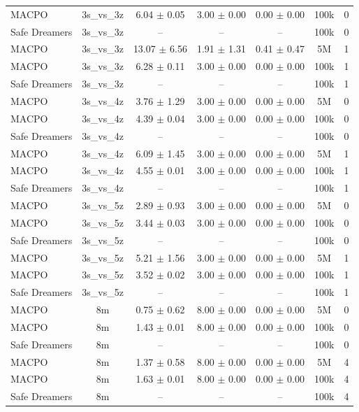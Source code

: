 \begin{longtable}{lcccccc}
MACPO & 3s\_vs\_3z & 6.04 $\pm$ 0.05 & 3.00 $\pm$ 0.00 & 0.00 $\pm$ 0.00 & 100k & 0 \\
Safe Dreamers & 3s\_vs\_3z & -- & -- & -- & 100k & 0 \\
\midrule
MACPO & 3s\_vs\_3z & 13.07 $\pm$ 6.56 & 1.91 $\pm$ 1.31 & 0.41 $\pm$ 0.47 & 5M & 1 \\
MACPO & 3s\_vs\_3z & 6.28 $\pm$ 0.11 & 3.00 $\pm$ 0.00 & 0.00 $\pm$ 0.00 & 100k & 1 \\
Safe Dreamers & 3s\_vs\_3z & -- & -- & -- & 100k & 1 \\
\midrule
MACPO & 3s\_vs\_4z & 3.76 $\pm$ 1.29 & 3.00 $\pm$ 0.00 & 0.00 $\pm$ 0.00 & 5M & 0 \\
MACPO & 3s\_vs\_4z & 4.39 $\pm$ 0.04 & 3.00 $\pm$ 0.00 & 0.00 $\pm$ 0.00 & 100k & 0 \\
Safe Dreamers & 3s\_vs\_4z & -- & -- & -- & 100k & 0 \\
\midrule
MACPO & 3s\_vs\_4z & 6.09 $\pm$ 1.45 & 3.00 $\pm$ 0.00 & 0.00 $\pm$ 0.00 & 5M & 1 \\
MACPO & 3s\_vs\_4z & 4.55 $\pm$ 0.01 & 3.00 $\pm$ 0.00 & 0.00 $\pm$ 0.00 & 100k & 1 \\
Safe Dreamers & 3s\_vs\_4z & -- & -- & -- & 100k & 1 \\
\midrule
MACPO & 3s\_vs\_5z & 2.89 $\pm$ 0.93 & 3.00 $\pm$ 0.00 & 0.00 $\pm$ 0.00 & 5M & 0 \\
MACPO & 3s\_vs\_5z & 3.44 $\pm$ 0.03 & 3.00 $\pm$ 0.00 & 0.00 $\pm$ 0.00 & 100k & 0 \\
Safe Dreamers & 3s\_vs\_5z & -- & -- & -- & 100k & 0 \\
\midrule
MACPO & 3s\_vs\_5z & 5.21 $\pm$ 1.56 & 3.00 $\pm$ 0.00 & 0.00 $\pm$ 0.00 & 5M & 1 \\
MACPO & 3s\_vs\_5z & 3.52 $\pm$ 0.02 & 3.00 $\pm$ 0.00 & 0.00 $\pm$ 0.00 & 100k & 1 \\
Safe Dreamers & 3s\_vs\_5z & -- & -- & -- & 100k & 1 \\
\midrule
MACPO & 8m & 0.75 $\pm$ 0.62 & 8.00 $\pm$ 0.00 & 0.00 $\pm$ 0.00 & 5M & 0 \\
MACPO & 8m & 1.43 $\pm$ 0.01 & 8.00 $\pm$ 0.00 & 0.00 $\pm$ 0.00 & 100k & 0 \\
Safe Dreamers & 8m & -- & -- & -- & 100k & 0 \\
\midrule
MACPO & 8m & 1.37 $\pm$ 0.58 & 8.00 $\pm$ 0.00 & 0.00 $\pm$ 0.00 & 5M & 4 \\
MACPO & 8m & 1.63 $\pm$ 0.01 & 8.00 $\pm$ 0.00 & 0.00 $\pm$ 0.00 & 100k & 4 \\
Safe Dreamers & 8m & -- & -- & -- & 100k & 4 \\

\end{longtable}
